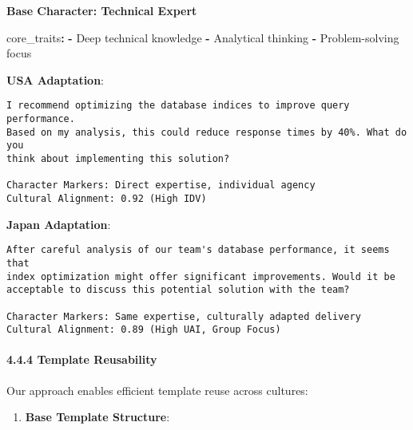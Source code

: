 \documentclass[
]{article}
\newenvironment{Shaded}{}{}
\newcommand{\AttributeTok}[1]{\textcolor[rgb]{0.49,0.56,0.16}{#1}}
\newcommand{\FunctionTok}[1]{\textcolor[rgb]{0.02,0.16,0.49}{#1}}
\newcommand{\KeywordTok}[1]{\textcolor[rgb]{0.00,0.44,0.13}{\textbf{#1}}}
\providecommand{\tightlist}{%
  \setlength{\itemsep}{0pt}\setlength{\parskip}{0pt}}
\begin{document}
\textbf{Base Character: Technical Expert}

\begin{Shaded}
\begin{Highlighting}[]
\FunctionTok{core\_traits}\KeywordTok{:}
\AttributeTok{  }\KeywordTok{{-}}\AttributeTok{ Deep technical knowledge}
\AttributeTok{  }\KeywordTok{{-}}\AttributeTok{ Analytical thinking}
\AttributeTok{  }\KeywordTok{{-}}\AttributeTok{ Problem{-}solving focus}
\end{Highlighting}
\end{Shaded}

\textbf{USA Adaptation}:

\begin{verbatim}
I recommend optimizing the database indices to improve query performance. 
Based on my analysis, this could reduce response times by 40%. What do you 
think about implementing this solution?

Character Markers: Direct expertise, individual agency
Cultural Alignment: 0.92 (High IDV)
\end{verbatim}

\textbf{Japan Adaptation}:

\begin{verbatim}
After careful analysis of our team's database performance, it seems that 
index optimization might offer significant improvements. Would it be 
acceptable to discuss this potential solution with the team?

Character Markers: Same expertise, culturally adapted delivery
Cultural Alignment: 0.89 (High UAI, Group Focus)
\end{verbatim}

\paragraph{4.4.4 Template Reusability}\label{template-reusability}

Our approach enables efficient template reuse across cultures:

\begin{enumerate}
\def\labelenumi{\arabic{enumi}.}
\tightlist
\item
  \textbf{Base Template Structure}:
\end{enumerate}
\end{document}
